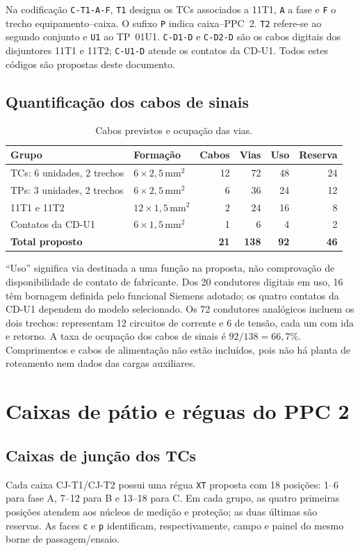 \documentclass[11pt,a4paper]{article}
\newcommand{\tagg}[1]{\texttt{#1}}
\newcommand{\cabana}{$6\times2{,}5\,\mathrm{mm^2}$}
\newcommand{\cabdig}{$12\times1{,}5\,\mathrm{mm^2}$}
\begin{document}
Na codificação \tagg{C-T1-A-F}, \tagg{T1} designa os TCs associados a 11T1,
\tagg{A} a fase e \tagg{F} o trecho equipamento--caixa. O sufixo \tagg{P} indica
caixa--PPC~2. \tagg{T2} refere-se ao segundo conjunto e \tagg{U1} ao TP~01U1.
\tagg{C-D1-D} e \tagg{C-D2-D} são os cabos digitais dos disjuntores 11T1 e 11T2;
\tagg{C-U1-D} atende os contatos da CD-U1.
Todos estes códigos são propostas deste documento.

\subsection{Quantificação dos cabos de sinais}
\begin{table}[htbp]\centering\small
\caption{Cabos previstos e ocupação das vias.}
\begin{tabularx}{\linewidth}{@{}YL{3.0cm}rrrr@{}}\toprule
Grupo & Formação & Cabos & Vias & Uso & Reserva \\\midrule
TCs: 6 unidades, 2 trechos & \cabana & 12 & 72 & 48 & 24\\
TPs: 3 unidades, 2 trechos & \cabana & 6 & 36 & 24 & 12\\
11T1 e 11T2 & \cabdig & 2 & 24 & 16 & 8\\
Contatos da CD-U1 & $6\times1{,}5\,\mathrm{mm^2}$ & 1 & 6 & 4 & 2\\\midrule
\textbf{Total proposto} & & \textbf{21} & \textbf{138} & \textbf{92} & \textbf{46}\\\bottomrule
\end{tabularx}\end{table}
``Uso'' significa via destinada a uma função na proposta, não comprovação de
disponibilidade de contato de fabricante. Dos 20 condutores digitais em uso, 16 têm bornagem definida pelo funcional
Siemens adotado; os quatro contatos da CD-U1 dependem do modelo selecionado. Os 72 condutores analógicos incluem os dois
trechos: representam 12 circuitos de corrente e 6 de tensão, cada um com ida e
retorno. A taxa de ocupação dos cabos de sinais é $92/138=66{,}7\%$.
Comprimentos e cabos de alimentação não estão incluídos, pois não há planta de
roteamento nem dados das cargas auxiliares.

\section{Caixas de pátio e réguas do PPC 2}\label{sec:caixas}
\subsection{Caixas de junção dos TCs}
Cada caixa CJ-T1/CJ-T2 possui uma régua \tagg{XT} proposta com 18 posições:
1--6 para fase A, 7--12 para B e 13--18 para C. Em cada grupo, as quatro primeiras
posições atendem aos núcleos de medição e proteção; as duas últimas são reservas.
As faces \tagg{c} e \tagg{p} identificam, respectivamente, campo e painel do mesmo
borne de passagem/ensaio.
\end{document}
